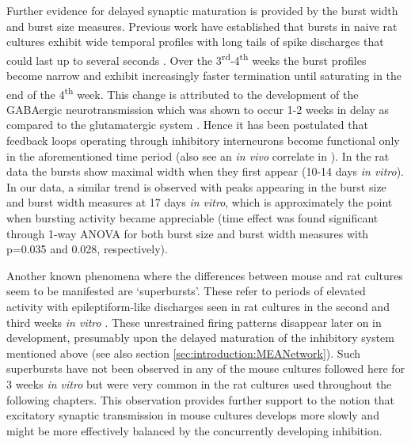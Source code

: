         Further evidence for delayed synaptic maturation is provided by the burst width and burst size measures. Previous work have established that bursts in naive rat cultures exhibit wide temporal profiles with long tails of spike discharges that could last up to several seconds \cite{chiappalone2006dissociated,van2004longterm}. Over the 3\textsuperscript{rd}-4\textsuperscript{th} weeks the burst profiles become narrow and exhibit increasingly faster termination until saturating in the end of the 4\textsuperscript{th} week. This change is attributed to the development of the GABAergic neurotransmission which was shown to occur 1-2 weeks in delay as compared to the glutamatergic system \cite{ramakers1994activity,swanwick2006development}. Hence it has been postulated that feedback loops operating through inhibitory interneurons become functional only in the aforementioned time period \cite{van2004long} (also see an \textit{in vivo} correlate in \cite{hensch2005critical}). In the rat data the bursts show maximal width when they first appear (10-14 days \textit{in vitro}). In our data, a similar trend is observed with peaks appearing in the burst size and burst width measures at 17 days \textit{in vitro}, which is approximately the point when bursting activity became appreciable (time effect was found significant through 1-way ANOVA for both burst size and burst width measures with p=0.035 and 0.028, respectively).

        Another known phenomena where the differences between mouse and rat cultures seem to be manifested are `superbursts'. These refer to periods of elevated activity with epileptiform-like discharges seen in rat cultures in the second and third weeks \textit{in vitro} \cite{wagenaar2006extremely}. These unrestrained firing patterns disappear later on in development, presumably upon the delayed maturation of the inhibitory system mentioned above (see also section \ref{sec:introduction:MEANetwork}). Such superbursts have not been observed in any of the mouse cultures followed here for 3 weeks \textit{in vitro} but were very common in the rat cultures used throughout the following chapters. This observation provides further support to the notion that excitatory synaptic transmission in mouse cultures develops more slowly and might be more effectively balanced by the concurrently developing inhibition.

